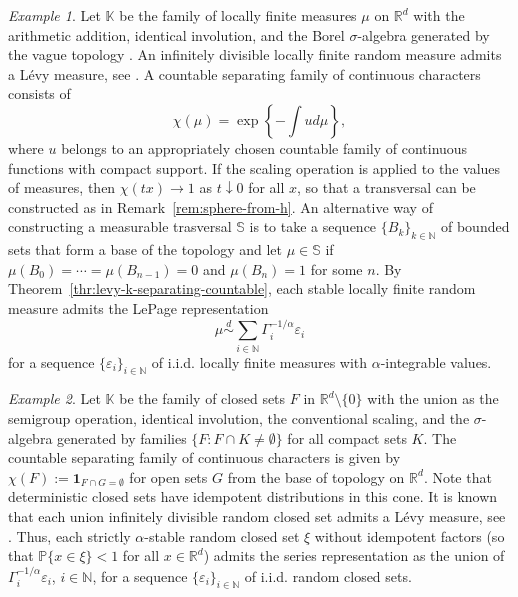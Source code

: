 \documentclass[12pt]{amsart}
\numberwithin{equation}{section}
\numberwithin{figure}{section}
\theoremstyle{plain} \newtheorem{theorem}{Theorem}[section]
\theoremstyle{plain} \newtheorem{proposition}[theorem]{Proposition}
\theoremstyle{plain} \newtheorem{lemma}[theorem]{Lemma}
\theoremstyle{plain} \newtheorem{corollary}[theorem]{Corollary}
\theoremstyle{definition} \newtheorem{definition}[theorem]{Definition}
\theoremstyle{definition} \newtheorem{notation}[theorem]{Notation}
\theoremstyle{remark} \newtheorem{remark}[theorem]{Remark}
\theoremstyle{remark} \newtheorem{example}[theorem]{Example}
\theoremstyle{definition} \newtheorem{assumption}{Assumption}
\newcommand{\bK}{\mathbb{K}}
\newcommand{\bN}{\mathbb{N}}
\newcommand{\bP}{\mathbb{P}}
\newcommand{\bR}{\mathbb{R}}
\newcommand{\bS}{\mathbb{S}}
\newcommand{\one}{\mathbf{1}}
\renewcommand{\epsilon}{\varepsilon}
\newcommand{\eps}{\epsilon}
\newcommand{\eqd}{\overset{d}{\sim}}
\begin{document}
\begin{example}
  Let $\bK$ be the family of locally finite measures $\mu$ on $\bR^d$
  with the arithmetic addition, identical involution, and the Borel
  $\sigma$-algebra generated by the vague topology
  \cite[Sec.~9.1]{MR2371524}. An infinitely divisible locally finite
  random measure admits a L\'evy measure, see \cite{MR2371524}. A
  countable separating family of continuous characters consists of
  \begin{displaymath}
    \chi(\mu)=\exp\left\{-\int ud\mu\right\},
  \end{displaymath}
  where $u$ belongs to an appropriately chosen countable family of
  continuous functions with compact support. If the scaling operation
  is applied to the values of measures, then $\chi(tx)\to1$ as
  $t\downarrow0$ for all $x$, so that a transversal can be constructed
  as in Remark~\ref{rem:sphere-from-h}. An alternative way of
  constructing a measurable trasversal $\bS$ is to take a sequence
  $\{B_k\}_{k\in\bN}$ of bounded sets that form a base of the topology
  and let $\mu\in\bS$ if $\mu(B_0)=\cdots=\mu(B_{n-1})=0$ and
  $\mu(B_n)=1$ for some $n$.  By
  Theorem~\ref{thr:levy-k-separating-countable}, each stable locally
  finite random measure admits the LePage representation
  \begin{displaymath}
    \mu\eqd \sum_{i\in\bN} \Gamma_i^{-1/\alpha}\eps_i 
  \end{displaymath}
  for a sequence $\{\eps_i\}_{i\in\bN}$ of i.i.d. locally finite
  measures with $\alpha$-integrable values.
\end{example}

\begin{example}
  Let $\bK$ be the family of closed sets $F$ in $\bR^d\setminus\{0\}$
  with the union as the semigroup operation, identical involution, the
  conventional scaling, and the $\sigma$-algebra generated by families
  $\{F:F\cap K\neq\emptyset\}$ for all compact sets $K$. The countable
  separating family of continuous characters is given by
  $\chi(F):=\one_{F\cap G=\emptyset}$ for open sets $G$ from
  the base of topology on $\bR^d$. Note that deterministic closed sets
  have idempotent distributions in this cone. It is known that each
  union infinitely divisible random closed set admits a L\'evy
  measure, see \cite{MR2132405}. Thus, each strictly $\alpha$-stable
  random closed set $\xi$ without idempotent factors (so that
  $\bP\{x\in \xi\}<1$ for all $x\in\bR^d$) admits the series
  representation as the union of $\Gamma_i^{-1/\alpha}\eps_i$,
  $i\in\bN$, for a sequence $\{\eps_i\}_{i\in\bN}$ of i.i.d.  random
  closed sets.
\end{example}
\end{document}
